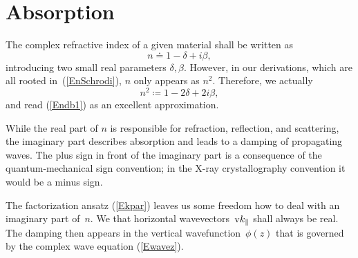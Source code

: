 
%

\section{Absorption}\label{Sabsorption}

%
%
The complex refractive index of a given material
shall be written as
\begin{equation}\label{Endb1}
  n\doteq 1-\delta +i\beta,  
\end{equation}
%
%
introducing two small real parameters $\delta, \beta$.
However, 
in our derivations, which are all rooted in~(\ref{EnSchrodi}),
$n$ only appears as $n^2$. 
Therefore, we actually 
\begin{equation}\label{Endb2}
  n^2\coloneqq 1-2\delta+2i\beta,
\end{equation}
and read (\ref{Endb1}) as an excellent approximation.

While the real part of $n$ is responsible for refraction, reflection,
and scattering,
the imaginary part describes absorption
and leads to a damping of propagating waves.
The plus sign in front of the imaginary part is a consequence of
the quantum-mechanical sign convention;
in the X-ray crystallography convention it would be a minus sign.
%

The factorization ansatz (\ref{Ekpar}) leaves us some freedom
how to deal with an imaginary part of~$n$.
We  that horizontal wavevectors~$\text{v}{k}_\parallel$
shall always be real.
The damping then appears in the vertical wavefunction~$\phi(z)$
that is governed by the complex wave equation (\ref{Ewavez}).

%

